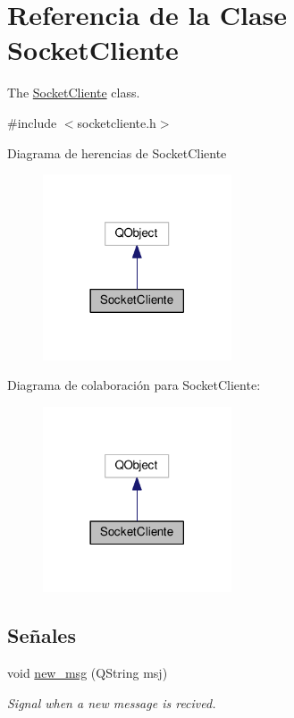 \hypertarget{classSocketCliente}{}\section{Referencia de la Clase Socket\+Cliente}
\label{classSocketCliente}


The \hyperlink{classSocketCliente}{Socket\+Cliente} class.  




{\ttfamily \#include $<$socketcliente.\+h$>$}



Diagrama de herencias de Socket\+Cliente
\nopagebreak
\begin{figure}[H]
\begin{center}
\leavevmode
\includegraphics[width=158pt]{classSocketCliente__inherit__graph}
\end{center}
\end{figure}


Diagrama de colaboración para Socket\+Cliente\+:
\nopagebreak
\begin{figure}[H]
\begin{center}
\leavevmode
\includegraphics[width=158pt]{classSocketCliente__coll__graph}
\end{center}
\end{figure}
\subsection*{Señales}
\begin{DoxyCompactItemize}
\item 
void \hyperlink{classSocketCliente_a5203829ebf869208e859c7a9306b5985}{new\+\_\+msg} (Q\+String msj)
\begin{DoxyCompactList}\small\item\em Signal when a new message is recived. \end{DoxyCompactList}\end{DoxyCompactItemize}

